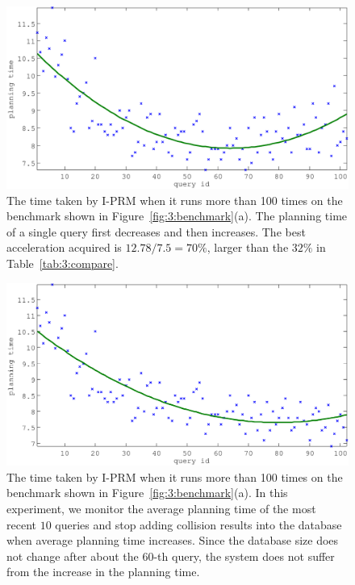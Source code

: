 \begin{figure}[!h]
  \centering
  \includegraphics[width=0.8\linewidth]{figs/3/curve1-crop.pdf}
  \caption[Time taken by I-PRM when it runs more than 100 times on the benchmark shown Figure~\ref{fig:3:benchmark}(a). The planning time first decreases and then increases because I-PRM continues updating the dataset in well-learned regions]{\label{fig:3:curve} The time taken by I-PRM when it runs more than 100 times on the benchmark shown in Figure~\ref{fig:3:benchmark}(a). The planning time of a single query first decreases and then increases. The best acceleration acquired is $12.78/7.5 = 70\%$, larger than the $32\%$ in Table~\ref{tab:3:compare}.}
\end{figure}
\begin{figure}[!h]
  \centering
  \includegraphics[width=0.8\linewidth]{figs/3/curve2-crop.pdf}
  \caption[Time taken by I-PRM when it runs more than 100 times on the benchmark shown Figure~\ref{fig:3:benchmark}(a). The planning time always decreases because I-PRM stops updating the dataset in well-learned regions]{\label{fig:3:curve2} The time taken by I-PRM when it runs more than 100 times on the benchmark shown in Figure~\ref{fig:3:benchmark}(a). In this experiment, we monitor the average planning time of the most recent $10$ queries and stop adding collision results into the database when average planning time increases. Since the database size does not change after about the $60$-th query, the system does not suffer from the increase in the planning time. }
\end{figure}



